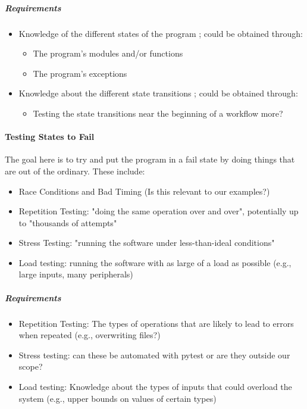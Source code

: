 \subparagraph{Requirements}
\begin{itemize}
      \item Knowledge of the different states of the program
            \cite[p.~82]{patton_software_2006}; could be obtained through:
            \begin{itemize}
                  \item The program's modules and/or functions
                  \item The program's exceptions
            \end{itemize}
      \item Knowledge about the different state transitions
            \cite[p.~82]{patton_software_2006}; could be obtained through:
            \begin{itemize}
                  \item Testing the state transitions near the beginning of a
                        workflow more?
            \end{itemize}
\end{itemize}

\paragraph{Testing States to Fail \cite[p.~84-87]{patton_software_2006}}

The goal here is to try and put the program in a fail state by doing things
that are out of the ordinary. These include:

\begin{itemize}
      \item Race Conditions and Bad Timing \cite[p.~85-86]{patton_software_2006}
            (Is this relevant to our examples?)
      \item Repetition Testing: "doing the same operation over and over",
            potentially up to "thousands of attempts"
            \cite[p.~86]{patton_software_2006}
      \item Stress Testing: "running the software under less-than-ideal conditions"
            \cite[p.~86]{patton_software_2006}
      \item Load testing: running the software with as large of a load as
            possible (e.g., large inputs, many peripherals)
            \cite[p.~86]{patton_software_2006}
\end{itemize}

\subparagraph{Requirements}
\begin{itemize}
      \item Repetition Testing: The types of operations that are likely to lead
            to errors when repeated (e.g., overwriting files?)
      \item Stress testing: can these be automated with pytest or are they
            outside our scope? %
      \item Load testing: Knowledge about the types of inputs that could
            overload the system (e.g., upper bounds on values of certain types)
\end{itemize}

